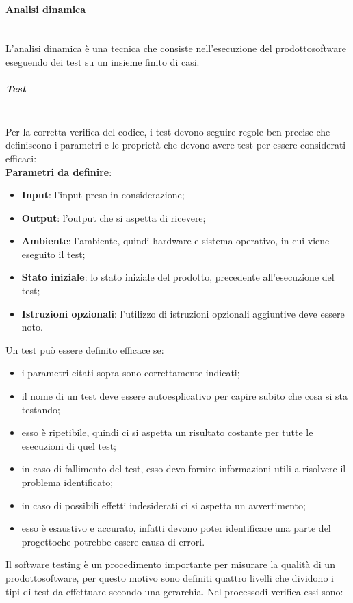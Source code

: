 \paragraph{Analisi dinamica} \mbox{}\\ [1mm]
L'analisi dinamica è una tecnica che consiste nell'esecuzione del prodotto\glosp software eseguendo dei test su un insieme finito di casi.
\subparagraph{Test}\mbox{}\\ [1mm]
Per la corretta verifica del codice, i test devono seguire regole ben precise che definiscono i parametri e le proprietà che devono avere test per essere considerati efficaci: \mbox{}\\ [1mm]
\textbf{Parametri da definire}:
\begin{itemize}
	\item \textbf{Input}: l'input preso in considerazione;
	\item \textbf{Output}: l'output che si aspetta di ricevere;
	\item \textbf{Ambiente}: l'ambiente, quindi hardware e sistema operativo, in cui viene eseguito il test;
	\item \textbf{Stato iniziale}: lo stato iniziale del prodotto\glo, precedente all'esecuzione del test;
	\item \textbf{Istruzioni opzionali}: l'utilizzo di istruzioni opzionali aggiuntive deve essere noto.
\end{itemize} 
Un test può essere definito efficace se:
\begin{itemize}
	\item i parametri citati sopra sono correttamente indicati;
	\item il nome di un test deve essere autoesplicativo per capire subito che cosa si sta testando;
	\item esso è ripetibile, quindi ci si aspetta un risultato costante per tutte le esecuzioni di quel test;
	\item in caso di fallimento del test, esso devo fornire informazioni utili a risolvere il problema identificato;
	\item in caso di possibili effetti indesiderati ci si aspetta un avvertimento;
	\item esso è esaustivo e accurato, infatti devono poter identificare una parte del progetto\glosp che potrebbe essere causa di errori.
\end{itemize}
Il software testing è un procedimento importante per misurare la qualità di un prodotto\glosp software, per questo motivo sono definiti quattro livelli che dividono i tipi di test da effettuare secondo una gerarchia. Nel processo\glosp di verifica essi sono: 
